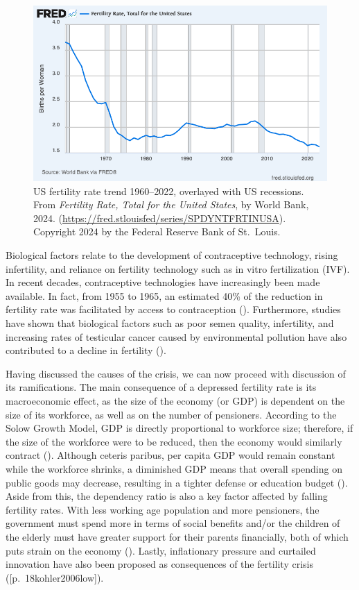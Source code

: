 \documentclass[12pt, a4paper, twoside]{article}
\begin{document}
\begin{figure}[h]
\centering
\includegraphics[width=0.9\linewidth]{fredgraph.png}
\caption{US fertility rate trend 1960–2022, overlayed with US recessions. From \emph{Fertility Rate, Total for the United States}, by World Bank, 2024. (\url{https://fred.stlouisfed/series/SPDYNTFRTINUSA}). Copyright 2024 by the Federal Reserve Bank of St.\ Louis.}
\label{fig:1}
\end{figure}

Biological factors relate to the development of contraceptive technology, rising infertility, and reliance on fertility technology such as in vitro fertilization (IVF). In recent decades, contraceptive technologies have increasingly been made available. In fact, from 1955 to 1965, an estimated 40\% of the reduction in fertility rate was facilitated by access to contraception (\cite[p.\ 25]{bailey2010mommas}). Furthermore, studies have shown that biological factors such as poor semen quality, infertility, and increasing rates of testicular cancer caused by environmental pollution have also contributed to a decline in fertility (\cite{skakkebaek2022environmental}).  

Having discussed the causes of the crisis, we can now proceed with discussion of its ramifications. The main consequence of a depressed fertility rate is its macroeconomic effect, as the size of the economy (or GDP) is dependent on the size of its workforce, as well as on the number of pensioners. According to the Solow Growth Model, GDP is directly proportional to workforce size; therefore, if the size of the workforce were to be reduced, then the economy would similarly contract (\cite{solow1956contribution}). Although ceteris paribus, per capita GDP would remain constant while the workforce shrinks, a diminished GDP means that overall spending on public goods may decrease, resulting in a tighter defense or education budget (\cite[p.\ 88]{kearney2023causes}). Aside from this, the dependency ratio is also a key factor affected by falling fertility rates. With less working age population and more pensioners, the government must spend more in terms of social benefits and/or the children of the elderly must have greater support for their parents financially, both of which puts strain on the economy (\cite[pp.\ 91–92]{kearney2023causes}). Lastly, inflationary pressure and curtailed innovation have also been proposed as consequences of the fertility crisis (\cites{jones2022end}[p.\ 18{kohler2006low}]).
\end{document}
